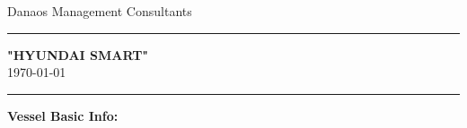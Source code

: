 \documentclass[a4paper,12pt,dvipsnames]{scrartcl}
\begin{document}
            
            
                            
                            
                            \begin{titlepage}
                            \begin{center}

                            \large{Danaos Management Consultants} \\

                            \vspace{1cm}
                            \noindent\rule{\textwidth}{1.5pt}
                            \vspace{0.3cm}

                            \LARGE{\textbf{ "HYUNDAI SMART" }} \\ %

                            \large{\today}\\

                            \vspace{1cm}


                            \vspace{0.3cm}
                            \noindent\rule{\textwidth}{1.5pt}
                            \vspace{1cm}
                            \end{center}

                            \noindent\normalsize{\textbf{Vessel Basic Info:}} \hfill \normalsize{} 

                            \vspace{0.5cm}


\end{titlepage}
\end{document}
